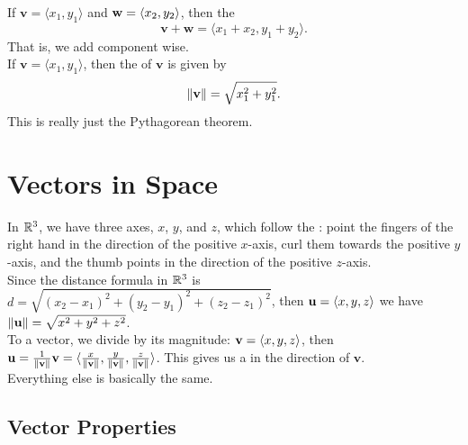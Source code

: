 If \(\mathbf{v} = \langle x_{1},y_{1} \rangle\) and \(\mathbf{w} = \langle x_{2},y_{2} \rangle\), then the  
\[
    \mathbf{v} + \mathbf{w} = \langle x_{1}+x_{2},y_{1}+y_{2}\rangle.
\] 
That is, we add component wise. \\

If \(\mathbf{v} = \langle x_{1},y_{1} \rangle\), then the  of \(\mathbf{v}\) is given by
\[
    \left\lVert \mathbf{v}\right\rVert = \sqrt{x_{1}^{2}+y_{1}^{2}}.
\]
This is really just the Pythagorean theorem. \\

\section{Vectors in Space}

In \(\mathbb{R}^{3}\), we have three axes, \(x\), \(y\), and \(z\), which follow the : point the fingers of the right hand in the direction of the positive \(x\)-axis, curl them towards the positive \(y\)-axis, and the thumb points in the direction of the positive \(z\)-axis. \\

Since the distance formula in \(\mathbb{R}^{3}\) is \(d = \sqrt{(x_{2} - x_{1})^{2} + (y_{2} - y_{1})^{2} + (z_{2} - z_{1})^{2}}\), then \(\mathbf{u} = \langle x,y,z \rangle\) we have \(\left\lVert \mathbf{u}\right\rVert = \sqrt{x^{2} + y^{2} + z^{2}}\). \\

To  a vector, we divide by its magnitude: \(\mathbf{v} = \langle x,y,z \rangle\), then \(\mathbf{u} = \frac{1}{\left\lVert \mathbf{v}\right\rVert}\mathbf{v} = \langle \frac{x}{\left\lVert \mathbf{v}\right\rVert},\frac{y}{\left\lVert \mathbf{v}\right\rVert},\frac{z}{\left\lVert \mathbf{v}\right\rVert} \rangle\). This gives us a  in the direction of \(\mathbf{v}\). \\

Everything else is basically the same.

\subsection{Vector Properties}

